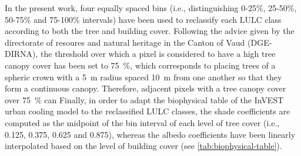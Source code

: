 \documentclass[10pt,letterpaper]{article}
\begin{document}
In the present work, four equally spaced bins (i.e., distinguishing 0-25\%, 25-50\%, 50-75\% and 75-100\% intervals) have been used to reclassify each LULC class according to both the tree and building cover.
Following the advice given by the directorate of resoures and natural heritage in the Canton of Vaud (DGE-DIRNA), the threshold over which a pixel is considered to have a high tree canopy cover has been set to 75~\%, which corresponds to placing trees of a spheric crown with a 5~m radius spaced 10~m from one another so that they form a continuous canopy.
Therefore, adjacent pixels with a tree canopy cover over 75~\% can 
Finally, in order to adapt the biophysical table of the InVEST urban cooling model to the reclassified LULC classes, the shade coefficients are computed as the midpoint of the bin interval of each level of tree cover (i.e., 0.125, 0.375, 0.625 and 0.875), whereas the albedo coefficients have been linearly interpolated based on the level of building cover (see \autoref{tab:biophysical-table}).





\end{document}
